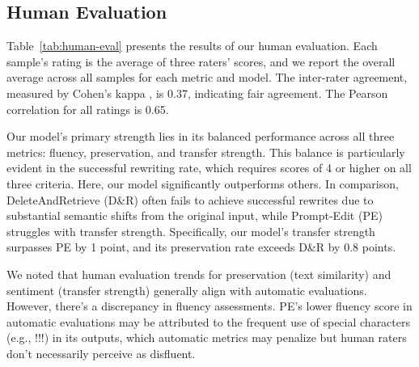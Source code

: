 \documentclass{article}
\begin{document}
\subsection{Human Evaluation}
Table~\ref{tab:human-eval} presents the results of our human evaluation. Each sample's rating is the average of three raters' scores, and we report the overall average across all samples for each metric and model. The inter-rater agreement, measured by Cohen's kappa \cite{cohen1960coefficient}, is 0.37, indicating fair agreement. The Pearson correlation for all ratings is 0.65.

Our model's primary strength lies in its balanced performance across all three metrics: fluency, preservation, and transfer strength. This balance is particularly evident in the successful rewriting rate, which requires scores of 4 or higher on all three criteria. Here, our model significantly outperforms others. In comparison, DeleteAndRetrieve (D\&R) often fails to achieve successful rewrites due to substantial semantic shifts from the original input, while Prompt-Edit (PE) struggles with transfer strength. Specifically, our model's transfer strength surpasses PE by 1 point, and its preservation rate exceeds D\&R by 0.8 points.

\begin{table}[htbp]
\begin{tiny}
    \centering
    \caption{\small Results of human evaluations. The best performance of each criterion from all models except human references is highlighted in bold. All the criteria are the higher the better}
    \label{tab:human-eval}
    \end{tiny}
\end{table}
We noted that human evaluation trends for preservation (text similarity) and sentiment (transfer strength) generally align with automatic evaluations. However, there's a discrepancy in fluency assessments. PE's lower fluency score in automatic evaluations may be attributed to the frequent use of special characters (e.g., !!!) in its outputs, which automatic metrics may penalize but human raters don't necessarily perceive as disfluent.
\end{document}
